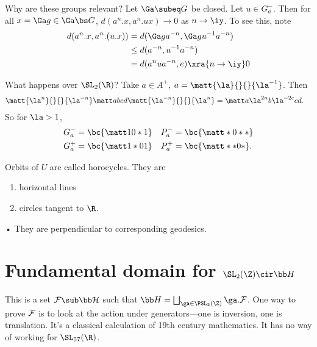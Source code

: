 Why are these groups relevant? Let $\Ga \subeq G$ be closed. Let $u\in G_a^-$. Then for all $x=\Ga g\in \Ga\bs G$, $d(a^n.x, a^n.ux)\to 0$ as $n\to \iy$.  To see this, note
\begin{align}
d(a^n.x,a^n.(u.x)) 
&= d(\Ga ga^{-n},\Ga gu^{-1}a^{-n})\\%
&\le d(a^{-n}, u^{-1}a^{-n}) \\
&= d(a^n ua^{-n},e)\xra{n\to \iy}0
\end{align}

What happens over $\SL_2(\R)$? Take $a\in A^+$, $a=\matt{\la}{}{}{\la^{-1}}$. Then
\begin{align}
\matt{\la^n}{}{}{\la^{-n}}\matt abcd \matt{\la^{-n}}{}{}{\la^n} &= \matt a{\la^{2n}b}{\la^{-2c}c}d.
\end{align}
So for $\la>1$, 
\begin{align}
G_a^- &= \bc{\matt 10*1} & P_a^- &= \bc{\matt *0**}\\
G_a^+ &= \bc{\matt 1*01} & P_a^+ &= \bc{\matt **0*}.
\end{align}

Orbits of $U$ are called horocycles. They are
\begin{enumerate}
\item
horizontal lines
\item
circles tangent to $\R$.
\end{enumerate}•
They are perpendicular to corresponding geodesics.

\section{Fundamental domain for $\SL_2(\Z)\cir \bb H$}

This is a set $ \cal F\sub \bb H$ such that $\bb H = \bigsqcup_{\ga\in \PSL_2(\Z)} \ga . \cal F$.
One way to prove $\cal F$ is to look at the action under generators---one is inversion, one is translation. It's a classical calculation of 19th century mathematics. It has no way of working for $\SL_{57}(\R)$. 

